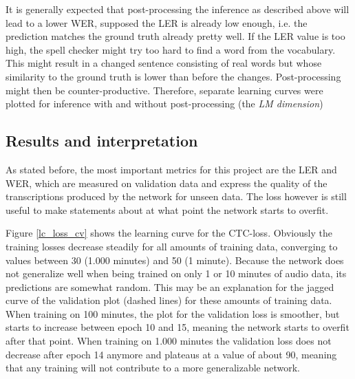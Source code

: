 It is generally expected that post-processing the inference as described above will lead to a lower \ac{WER}, supposed the \ac{LER} is already low enough, i.e. the prediction matches the ground truth already pretty well. If the \ac{LER} value is too high, the spell checker might try too hard to find a word from the vocabulary. This might result in a changed sentence consisting of real words but whose similarity to the ground truth is lower than before the changes. Post-processing might then be counter-productive. Therefore, separate learning curves were plotted for inference with and without post-processing (the \textit{\ac{LM} dimension})

\subsection{Results and interpretation}

As stated before, the most important metrics for this project are the \ac{LER} and \ac{WER}, which are measured on validation data and express the quality of the transcriptions produced by the network for unseen data. The loss however is still useful to make statements about at what point the network starts to overfit.

Figure \ref{lc_loss_cv} shows the learning curve for the \ac{CTC}-loss. Obviously the training losses decrease steadily for all amounts of training data, converging to values between 30 (1.000 minutes) and 50 (1 minute). Because the network does not generalize well when being trained on only 1 or 10 minutes of audio data, its predictions are somewhat random. This may be an explanation for the jagged curve of the validation plot (dashed lines) for these amounts of training data. When training on 100 minutes, the plot for the validation loss is smoother, but starts to increase between epoch 10 and 15, meaning the network starts to overfit after that point. When training on 1.000 minutes the validation loss does not decrease after epoch 14 anymore and plateaus at a value of about 90, meaning that any training will not contribute to a more generalizable network.

